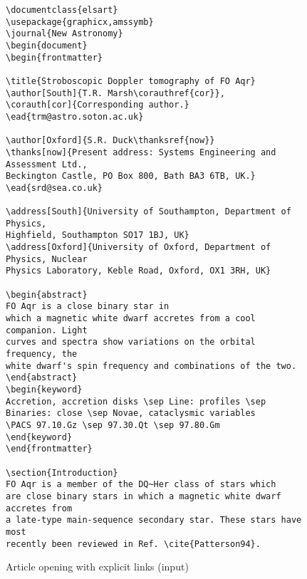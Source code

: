 \documentclass{elsart}
\begin{document}
\begin{figure}[p]

\caption{Article opening with explicit links (input)} \label{ex:explinput}
\vspace{1pc}

\begin{verbatim}
\documentclass{elsart}
\usepackage{graphicx,amssymb}
\journal{New Astronomy}
\begin{document}
\begin{frontmatter}

\title{Stroboscopic Doppler tomography of FO Aqr}
\author[South]{T.R. Marsh\corauthref{cor}},
\corauth[cor]{Corresponding author.}
\ead{trm@astro.soton.ac.uk}

\author[Oxford]{S.R. Duck\thanksref{now}}
\thanks[now]{Present address: Systems Engineering and Assessment Ltd.,
Beckington Castle, PO Box 800, Bath BA3 6TB, UK.}
\ead{srd@sea.co.uk}

\address[South]{University of Southampton, Department of Physics,
Highfield, Southampton SO17 1BJ, UK} 
\address[Oxford]{University of Oxford, Department of Physics, Nuclear
Physics Laboratory, Keble Road, Oxford, OX1 3RH, UK}
 
\begin{abstract} 
FO Aqr is a close binary star in
which a magnetic white dwarf accretes from a cool companion. Light
curves and spectra show variations on the orbital frequency, the
white dwarf's spin frequency and combinations of the two.
\end{abstract}
\begin{keyword}
Accretion, accretion disks \sep Line: profiles \sep
Binaries: close \sep Novae, cataclysmic variables 
\PACS 97.10.Gz \sep 97.30.Qt \sep 97.80.Gm 
\end{keyword}
\end{frontmatter}

\section{Introduction}
FO Aqr is a member of the DQ~Her class of stars which
are close binary stars in which a magnetic white dwarf accretes from
a late-type main-sequence secondary star. These stars have most
recently been reviewed in Ref. \cite{Patterson94}. 
\end{verbatim}

\end{figure}

\end{document}
